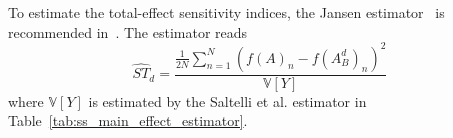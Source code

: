 To estimate the total-effect sensitivity indices, the Jansen estimator~\cite{Jansen1999} is recommended in~\cite{Saltelli2010a}.
The estimator reads
\begin{equation}
  \widehat{ST}_d = \frac{\frac{1}{2N}\sum_{n=1}^{N}\left(f(A)_n - f(A_B^d)_n\right)^2}{\mathbb{V}[Y]}
\label{eq:ss_jansen_estimator}
\end{equation}
where $\mathbb{V}[Y]$ is estimated by the Saltelli et al. estimator in Table~\ref{tab:ss_main_effect_estimator}.
